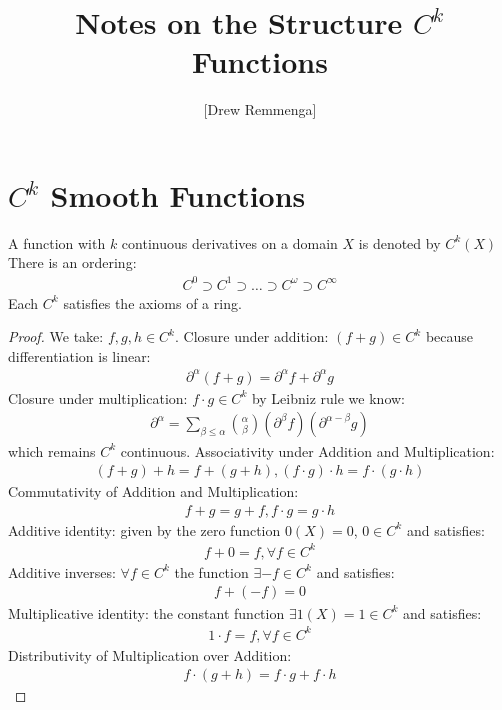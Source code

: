 \documentclass[10pt, oneside]{article}
\title{Notes on the Structure $C^k$ Functions}
\author{[Drew Remmenga]}
\begin{document}
\maketitle
\begin{abstract}
\end{abstract}
\section*{$C^k$ Smooth Functions}
  A function with $k$ continuous derivatives on a domain $X$ is denoted by $C^k(X)$ \cite{Lang1999}
  There is an ordering:
  \begin{align*}
     C^0 \supset C^1 \supset \dots \supset C^{\omega} \supset C^{\infty}
  \end{align*}
  Each $C^k$ satisfies the axioms of a ring.
  \begin{proof}
     We take: $f, g, h \in C^k$.
     Closure under addition: $(f+g) \in C^k$ because differentiation is linear:
     \begin{align*}
        \partial^\alpha (f+g) = \partial^\alpha f + \partial^\alpha g
     \end{align*}
     Closure under multiplication: $f \cdot g \in C^k$ by Leibniz rule we know:
     \begin{align*}
        \partial^\alpha = \sum_{\beta \leq \alpha} {\alpha \choose \beta} (\partial^{\beta} f)(\partial^{\alpha - \beta}g)
     \end{align*}
     which remains $C^k$ continuous.
     Associativity under Addition and Multiplication:
     \begin{align*}
        (f+g)+h = f+(g+h), (f\cdot g)\cdot h = f\cdot (g \cdot h)
     \end{align*}
     Commutativity of Addition and Multiplication:
     \begin{align*}
        f+g=g+f, f\cdot g = g\cdot h
     \end{align*}
     Additive identity: given by the zero function $0(X) = 0$, $0 \in C^k$ and satisfies:
     \begin{align*}
        f+0=f, \forall f \in C^k
     \end{align*}
     Additive inverses: $\forall f \in C^k$ the function $\exists -f \in C^k$ and satisfies:
     \begin{align*}
        f+(-f) = 0
     \end{align*}
     Multiplicative identity: the constant function $\exists 1(X) = 1 \in C^k$ and satisfies:
     \begin{align*}
        1 \cdot f = f, \forall f \in C^k
     \end{align*}
     Distributivity of Multiplication over Addition:
     \begin{align*}
        f \cdot (g + h) = f \cdot g + f \cdot h
     \end{align*}
  \end{proof}
\end{document}
